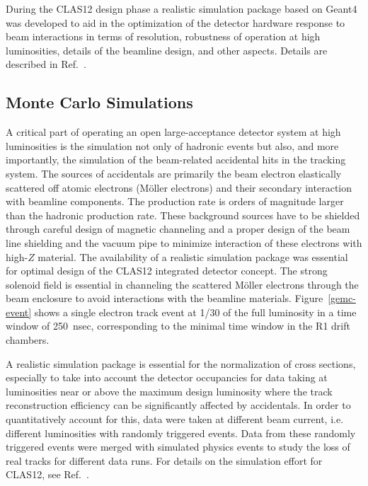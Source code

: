 \documentclass[final,3p,times,twocolumn,authoryear]{elsarticle}
\begin{document}
During the CLAS12 design phase a realistic simulation package based on Geant4 was developed to aid in the optimization 
of the detector hardware response to beam interactions in terms of resolution, robustness of operation at high luminosities, details of the beamline design, and other aspects.   Details are described in Ref.~\cite{Software}. 

\subsection{\rm Monte Carlo Simulations} 
A critical part of operating an open large-acceptance detector system at high luminosities is the 
simulation not only of hadronic
events but also, and more importantly, the simulation of the beam-related accidental hits in the tracking system. The 
sources of accidentals are primarily the beam electron elastically scattered off atomic electrons (M{\"o}ller electrons) and their secondary interaction 
with beamline components. The production rate is orders of magnitude larger than the hadronic production rate. 
These background sources have to be shielded through careful design of magnetic channeling and a proper design of  the beam line shielding
 and the vacuum pipe to minimize interaction of these electrons with high-$Z$ material. The availability of a realistic 
 simulation package was essential for optimal design of the CLAS12 integrated detector concept. The strong solenoid field 
 is essential in channeling the scattered M{\"o}ller electrons through the beam enclosure to avoid interactions with the 
 beamline materials. Figure~\ref{gemc-event}  shows a single electron track event at 1/30 of the full luminosity in a time window of 250~nsec, corresponding to the minimal time 
 window in the R1 drift chambers. 
 
 A realistic simulation package is essential for the normalization of cross sections, especially to take into account the 
 detector occupancies for data taking at luminosities near or above the maximum design luminosity where the track 
 reconstruction efficiency can be significantly affected by accidentals. In order to quantitatively account for this, data were taken at different beam current, i.e. different luminosities with randomly triggered events. Data from these 
 randomly triggered events were merged with simulated physics events to study the loss of real tracks for different 
 data runs. For details on the simulation effort for CLAS12, see Ref.~\cite{GEMC}.    

\end{document}
